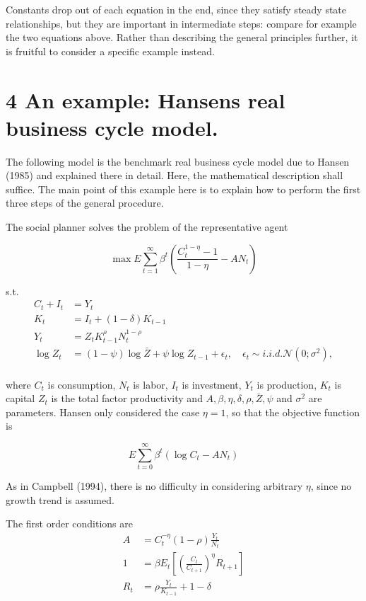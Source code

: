 \documentclass[10pt]{article}
\begin{document}
Constants drop out of each equation in the end, since they satisfy steady state relationships, but they are important in intermediate steps: compare for example the two equations above. Rather than describing the general principles further, it is fruitful to consider a specific example instead.

\section*{4 An example: Hansens real business cycle model.}
The following model is the benchmark real business cycle model due to Hansen (1985) and explained there in detail. Here, the mathematical description shall suffice. The main point of this example here is to explain how to perform the first three steps of the general procedure.

The social planner solves the problem of the representative agent

\begin{equation*}
\max E \sum_{t=1}^{\infty} \beta^{t}\left(\frac{C_{t}^{1-\eta}-1}{1-\eta}-A N_{t}\right)
\end{equation*}

s.t.\\
\begin{align*}
C_{t}+I_{t} & =Y_{t}  \tag{4.1}\\
K_{t} & =I_{t}+(1-\delta) K_{t-1} \\
Y_{t} & =Z_{t} K_{t-1}^{\rho} N_{t}^{1-\rho} \\
\log Z_{t} & =(1-\psi) \log \bar{Z}+\psi \log Z_{t-1}+\epsilon_{t}, \quad \epsilon_{t} \sim i . i . d . \mathcal{N}\left(0 ; \sigma^{2}\right),
\end{align*}\\
where $C_{t}$ is consumption, $N_{t}$ is labor, $I_{t}$ is investment, $Y_{t}$ is production, $K_{t}$ is capital $Z_{t}$ is the total factor productivity and $A, \beta, \eta, \delta, \rho, \bar{Z}, \psi$ and $\sigma^{2}$ are parameters. Hansen only considered the case $\eta=1$, so that the objective function is

\begin{equation*}
E \sum_{t=0}^{\infty} \beta^{t}\left(\log C_{t}-A N_{t}\right)
\end{equation*}

As in Campbell (1994), there is no difficulty in considering arbitrary $\eta$, since no growth trend is assumed.

The first order conditions are\\
\begin{align*}
A & =C_{t}^{-\eta}(1-\rho) \frac{Y_{t}}{N_{t}} \\
1 & =\beta E_{t}\left[\left(\frac{C_{t}}{C_{t+1}}\right)^{\eta} R_{t+1}\right]  \tag{4.2}\\
R_{t} & =\rho \frac{Y_{t}}{K_{t-1}}+1-\delta \tag{4.3}
\end{align*}
\end{document}
